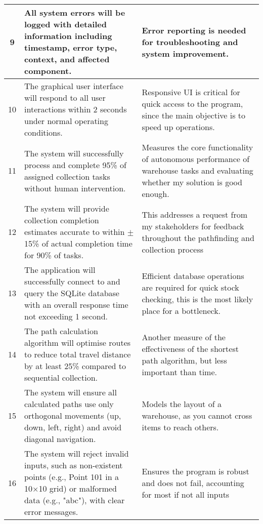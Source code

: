 \begin{table}[htbp!]
\begin{tabularx}{\textwidth}{|c|X|X|}
		\hline
		9 & All system errors will be logged with detailed information including timestamp, error type, context, and affected component. & Error reporting is needed for troubleshooting and system improvement. \\
		\hline
		10 & The graphical user interface will respond to all user interactions within 2 seconds under normal operating conditions. & Responsive UI is critical for quick access to the program, since the main objective is to speed up operations. \\
		\hline
		11 & The system will successfully process and complete 95\% of assigned collection tasks without human intervention. & Measures the core functionality of autonomous performance of warehouse tasks and evaluating whether my solution is good enough. \\
		\hline
		12 & The system will provide collection completion estimates accurate to within $\pm$15\% of actual completion time for 90\% of tasks. & This addresses a request from my stakeholders for feedback throughout the pathfinding and collection process \\
		\hline
		13 & The application will successfully connect to and query the SQLite database with an overall response time not exceeding 1 second. & Efficient database operations are required for quick stock checking, this is the most likely place for a bottleneck. \\
		\hline
		14 & The path calculation algorithm will optimise routes to reduce total travel distance by at least 25\% compared to sequential collection. & Another measure of the effectiveness of the shortest path algorithm, but less important than time. \\
		\hline
		15 & The system will ensure all calculated paths use only orthogonal movements (up, down, left, right) and avoid diagonal navigation. & Models the layout of a warehouse, as you cannot cross items to reach others. \\
		\hline
		16 & The system will reject invalid inputs, such as non-existent points (e.g., Point 101 in a 10×10 grid) or malformed data (e.g., "abc"), with clear error messages. & Ensures the program is robust and does not fail, accounting for most if not all inputs \\
		\hline
		\end{tabularx}
		\end{table}
		\newpage
